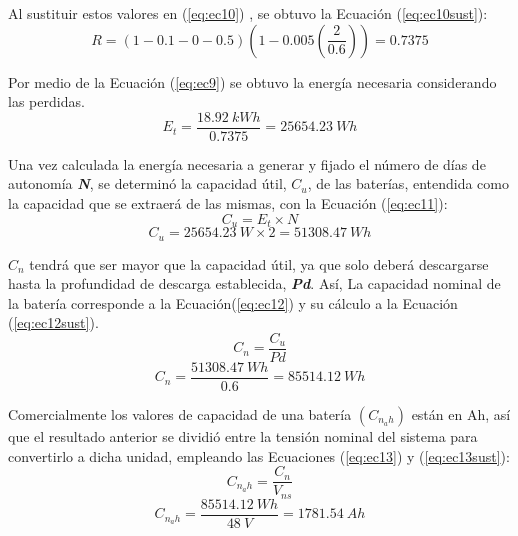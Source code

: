Al sustituir estos valores en (\ref{eq:ec10}) , se obtuvo la Ecuación (\ref{eq:ec10sust}): 
\begin{equation}\label{eq:ec10sust}
R = (1-0.1-0-0.5) (1-0.005 (\frac{2}{0.6}))=0.7375 
\end{equation}

Por medio de la Ecuación (\ref{eq:ec9}) se obtuvo la energía necesaria considerando las perdidas.
\begin{equation}\label{eq:ec9sust}
E_{t} = \frac{18.92 \ kWh}{0.7375}=25654.23 \ Wh   
\end{equation}

Una vez calculada la energía necesaria a generar y fijado el número de días de autonomía \textit{\textbf{N}}, se determinó la capacidad útil, \textbf{$C_{u}$}, de las baterías, entendida como la capacidad que se extraerá de las mismas, con la Ecuación (\ref{eq:ec11}): 
\begin{equation}\label{eq:ec11}
C_{u} = E_{t} \times N   
\end{equation}
\begin{equation}\label{eq:ec11sust}
C_{u} =25654.23 \ W \times 2 = 51308.47 \ Wh   
\end{equation}

\textbf{$C_{n}$} tendrá que ser mayor que la capacidad útil, ya que solo deberá descargarse hasta la profundidad de descarga establecida, \textit{\textbf{Pd}}. Así, La capacidad nominal de la batería corresponde a la Ecuación(\ref{eq:ec12}) y su cálculo a la Ecuación (\ref{eq:ec12sust}). 
\begin{equation}\label{eq:ec12}
C_{n} = \frac{C_{u}}{Pd}
\end{equation}
\begin{equation}\label{eq:ec12sust}
C_{n} = \frac{51308.47 \ Wh}{0.6}=85514.12 \ Wh
\end{equation}

Comercialmente los valores de capacidad de una batería $(C_{n_ah})$ están en Ah, así que el resultado anterior se dividió entre la tensión nominal del sistema para convertirlo a dicha unidad, empleando las Ecuaciones (\ref{eq:ec13}) y (\ref{eq:ec13sust}):
\begin{equation}\label{eq:ec13}
C_{n_ah} = \frac{C_{n}}{V_{ns}}
\end{equation}
\begin{equation}\label{eq:ec13sust}
C_{n_ah} = \frac{85514.12 \ Wh}{48 \ V}=1781.54 \ Ah
\end{equation}

